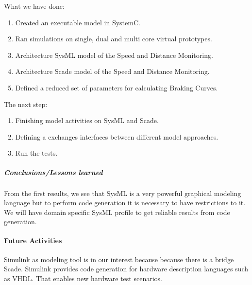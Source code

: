 \documentclass{article}
\begin{document}
What we have done:
\begin{enumerate}
\item Created an executable model in SystemC.
\item Ran simulations on single, dual and multi core virtual prototypes.
\item Architecture SysML model of the Speed and Distance Monitoring.
\item Architecture Scade model of the Speed and Distance Monitoring.
\item Defined a reduced set of parameters for calculating Braking Curves.
\end{enumerate}
 
 The next step:
 \begin{enumerate}
 \item Finishing model activities on SysML and Scade.
 \item Defining a exchanges interfaces between different model approaches.
 \item Run the tests.
 \end{enumerate}
\subparagraph{Conclusions/Lessons learned}
From the first results, we see that SysML is a very powerful graphical modeling language but to perform code generation it is necessary to have restrictions to it. We will have domain specific SysML profile to get reliable results from code generation.  


\paragraph{Future Activities}
Simulink as modeling tool is in our interest because because there is a bridge Scade. Simulink provides code generation for hardware description languages such as VHDL. That enables new hardware test scenarios.



\end{document}
